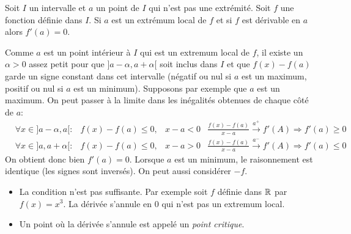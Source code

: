 \begin{prop}
 Soit $I$ un intervalle et $a$ un point de $I$ qui n'est pas une extrémité. Soit $f$ une fonction définie dans $I$. Si $a$ est un extrémum local de $f$ et si $f$ est dérivable en $a$ alors $f'(a)=0$.
\end{prop}
\begin{demo}
 Comme $a$ est un point intérieur à $I$ qui est un extremum local de $f$, il existe un $\alpha>0$ assez petit pour que $]a-\alpha, a+\alpha[$ soit inclus dans $I$ et que $f(x)-f(a)$ garde un signe constant dans cet intervalle (négatif ou nul si $a$ est un maximum, positif ou nul si $a$ est un minimum).\newline
Supposons par exemple que $a$ est un maximum. On peut passer à la limite dans les inégalités obtenues de chaque côté de $a$:
\begin{align*}
 &\forall x\in ]a-\alpha, a[: &f(x)-f(a)\leq 0, & x-a<0 &\frac{f(x)-f(a)}{x-a}\xrightarrow{a^{+}}f'(A)\Rightarrow f'(a)\geq 0 \\
&\forall x\in ]a, a+\alpha[: &f(x)-f(a)\leq 0, & x-a>0 &\frac{f(x)-f(a)}{x-a}\xrightarrow{a^{-}}f'(A)\Rightarrow f'(a)\leq 0  
\end{align*}
On obtient donc bien $f'(a)=0$. Lorsque $a$ est un minimum, le raisonnement est identique (les signes sont inversés). On peut aussi considérer $-f$.
\end{demo}
\begin{rems}
 \begin{itemize}
  \item La condition n'est pas suffisante. Par exemple soit $f$ définie dans $\mathbb{R}$ par $f(x)=x^3$. La dérivée s'annule en $0$ qui n'est pas un extremum local. 
  \item Un point où la dérivée s'annule est appelé un \emph{point critique}.
 \end{itemize}
 
\end{rems}

